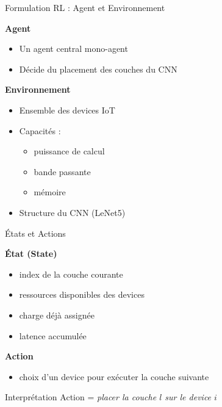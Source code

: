 \documentclass[aspectratio=169]{beamer}
\begin{document}
\begin{frame}{Formulation RL : Agent et Environnement}

\textbf{Agent}
\begin{itemize}
    \item Un agent central mono-agent
    \item Décide du placement des couches du CNN
\end{itemize}

\vspace{0.2cm}
\textbf{Environnement}
\begin{itemize}
    \item Ensemble des devices IoT
    \item Capacités :
    \begin{itemize}
        \item puissance de calcul
        \item bande passante
        \item mémoire
    \end{itemize}
    \item Structure du CNN (LeNet5)
\end{itemize}

\end{frame}

\begin{frame}{États et Actions}

\textbf{État (State)}
\begin{itemize}
    \item index de la couche courante
    \item ressources disponibles des devices
    \item charge déjà assignée
    \item latence accumulée
\end{itemize}

\vspace{0.2cm}
\textbf{Action}
\begin{itemize}
    \item choix d’un device pour exécuter la couche suivante
\end{itemize}

\vspace{0.2cm}
\begin{block}{Interprétation}
Action = \textit{placer la couche $l$ sur le device $i$}
\end{block}

\end{frame}
\end{document}
